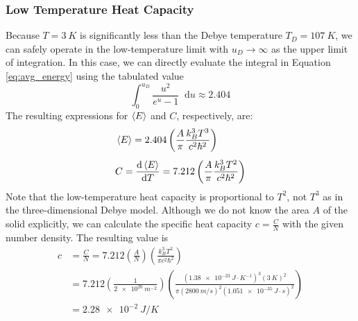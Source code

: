 \documentclass[11pt, a4paper]{article}
\newcommand*\diff{\mathop{}\!\mathrm{d}} %
\begin{document}
\subsubsection*{Low Temperature Heat Capacity}
Because $ T = \SI{3}{K}$ is significantly less than the Debye temperature $ T_D = \SI{107}{K} $, we can safely operate in the low-temperature limit with $ u_D \to \infty $ as the upper limit of integration. In this case, we can directly evaluate the integral in Equation \ref{eq:avg_energy} using the tabulated value
\begin{equation*}
	\int_{0}^{u_D} \frac{u^2}{e^{u} - 1} \diff u \approx 2.404
\end{equation*}
The resulting expressions for $ \expval{E} $ and $ C $, respectively, are:
\begin{align*}
	&\expval{E} = 2.404 \left(\frac{A}{\pi} \frac{k_B^3 T^3}{c^2 \hbar^2} \right) \\[1.0ex]
	&C = \dv{\expval{E}}{T} =  7.212 \left(\frac{A}{\pi} \frac{k_B^3 T^2}{c^2 \hbar^2} \right) 
\end{align*}
Note that the low-temperature heat capacity is proportional to $ T^2 $, not $ T^3 $ as in the three-dimensional Debye model. Although we do not know the area $ A $ of the solid explicitly, we can calculate the specific heat capacity $ c = \frac{C}{N} $ with the given number density. The resulting value is
\begin{align*}
	c &= \frac{C}{N} =  7.212 \left(\frac{A}{N}\right) \left(\frac{k_B^3 T^2}{\pi c^2 \hbar^2} \right) \\[1.0ex]
	&= 7.212 \left(\frac{1}{\SI{2e20}{m^{-2}}}\right) \left(\frac{\left(\SI{1.38e-23}{J\cdot K^{-1}}\right)^3 (\SI{3}{K})^2}{\pi \left(\SI{2800}{m/s}\right)^2 \left(\SI{1.051e-35}{J\cdot s}\right)^2}\right)\\[1.0ex]
	&= \boxed{\SI{2.28e-2}{J/K}}
\end{align*}
\end{document}
